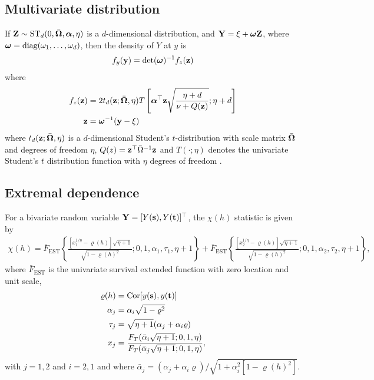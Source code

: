 \subsection*{Multivariate \skewt distribution}
If $\mathbf{Z} \sim \text{ST}_d(0, \bar{\mbox{\boldmath $\Omega$}}, \mbox{\boldmath $\alpha$}, \eta)$ is a $d$-dimensional \skewt distribution, and $\mathbf{Y} = \xi + \mbox{\boldmath $\omega$} \mathbf{Z}$, where $\mbox{\boldmath $\omega$} = \text{diag}(\omega_1, \ldots, \omega_d)$, then the density of $Y$ at $y$ is
\begin{align}
  f_y(\mathbf{y}) = \det(\mbox{\boldmath $\omega$})^{-1} f_z(\mathbf{z})
\end{align}
where
\begin{align}
  f_z(\mathbf{z}) &= 2 t_d(\mathbf{z}; \bar{\mbox{\boldmath $\Omega$}}, \eta) T \left[ \mbox{\boldmath $\alpha$}^\top \mathbf{z} \sqrt{ \frac{\eta + d}{\nu + Q(\mathbf{z})} }; \eta + d\right] \\
  \mathbf{z} &= \mbox{\boldmath $\omega$}^{-1}(\mathbf{y} - \xi)
\end{align}
where $t_d(\mathbf{z}; \bar{\mbox{\boldmath $\Omega$}}, \eta)$ is a $d$-dimensional Student's $t$-distribution with scale matrix $\bar{\mbox{\boldmath $\Omega$}}$ and degrees of freedom $\eta$, $Q(z) = \mathbf{z}^\top \bar{\Omega}^{-1}\mathbf{z}$ and $T(\cdot; \eta)$ denotes the univariate Student's $t$ distribution function with $\eta$ degrees of freedom \citep{Azzalini2014}.

\subsection*{Extremal dependence}
For a bivariate \skewt random variable $\mathbf{Y} = [Y(\mathbf{s}), Y(\mathbf{t})]^\top$, the $\chi(h)$ statistic \citep{Padoan2011} is given by
\begin{align} \label{steq:chiskew-t}
  \chi(h) = \bar{F}_{\text{EST}}\left\{ \frac{[x_1^{1 / \eta} - \varrho(h)] \sqrt{\eta + 1} }{\sqrt{1 - \varrho(h)^2}}; 0, 1, \alpha_1, \tau_1, \eta + 1 \right\} + \bar{F}_{\text{EST}}\left\{ \frac{ [x_2^{1 / \eta} - \varrho(h)] \sqrt{\eta + 1} }{ \sqrt{1 - \varrho(h)^2} }; 0, 1, \alpha_2, \tau_2, \eta + 1 \right\},
\end{align}
where $\bar{F}_{\text{EST}}$ is the univariate survival extended \skewt function with zero location and unit scale,
\begin{align*}
  \varrho(h) &= \text{Cor}[y(\mathbf{s}), y(\mathbf{t})]\\
  \alpha_j &= \alpha_i \sqrt{1 - \varrho^2}\\
  \tau_j &= \sqrt{\eta + 1}(\alpha_j + \alpha_i \varrho)\\
  x_j &= \displaystyle\frac{F_T(\bar{\alpha}_i \sqrt{\eta + 1}; 0, 1, \eta)}{F_T(\bar{\alpha}_j \sqrt{\eta + 1}; 0, 1, \eta)},
\end{align*}
with $j = 1, 2$ and $i = 2, 1$ and where $\bar{\alpha}_j = (\alpha_j + \alpha_i \varrho) / \sqrt{ 1 + \alpha_i^2 [1 - \varrho(h)^2]}$.

